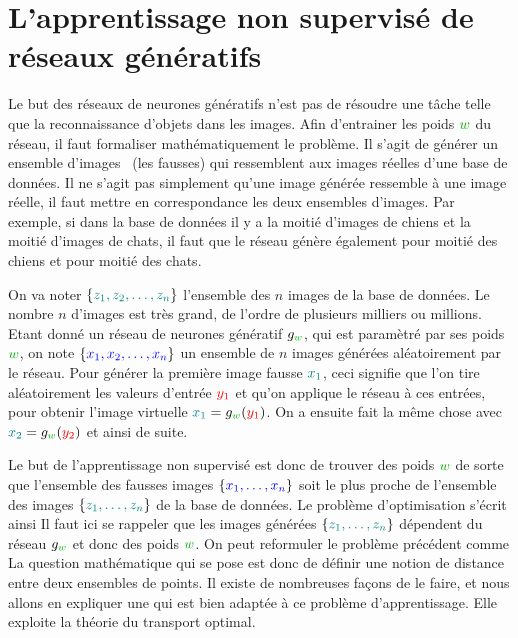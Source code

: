 \section{L'apprentissage non supervisé de réseaux génératifs}
\label{sec-app-gen}

Le but des réseaux de neurones génératifs n'est pas de résoudre une tâche telle que la reconnaissance d'objets dans les images. 
%
Afin d'entrainer les poids $\mygreen{w}$ du réseau, il faut formaliser mathématiquement le problème. Il s'agit de générer un ensemble d'images  (les fausses) qui ressemblent aux images réelles d'une base de données. Il ne s'agit pas simplement qu'une image générée ressemble à une image réelle, il faut mettre en correspondance les deux ensembles d'images. Par exemple, si dans la base de données il y a la moitié d'images de chiens et la moitié d'images de chats, il faut que le réseau génère également pour moitié des chiens et pour moitié des chats. 

On va noter $\{\mylblue{z_1,z_2,\ldots,z_n}\}$ l'ensemble des $n$ images de la base de données. Le nombre $n$ d'images est très grand, de l'ordre de plusieurs milliers ou millions. Etant donné un réseau de neurones génératif $g_{\mygreen{w}}$, qui est paramètré par ses poids $\mygreen{w}$, on note $\{\myblue{x_1,x_2,\ldots,x_n}\}$ un ensemble de $n$ images  générées aléatoirement par le réseau. Pour générer la première image fausse $\mylblue{x_1}$, ceci signifie que l'on tire aléatoirement les valeurs d'entrée ${\color{red}y_1}$ et qu'on applique le réseau à ces entrées, pour obtenir l'image virtuelle $\mylblue{x_1} = g_{\mygreen{w}}({\color{red}y_1})$. On a ensuite fait la même chose avec $\mylblue{x_2} = g_{\mygreen{w}}({\color{red}y_2})$ et ainsi de suite. 

Le but de l'apprentissage non supervisé est donc de trouver des poids $\mygreen{w}$ de sorte que l'ensemble des fausses images $\{\myblue{x_1,\ldots,x_n}\}$ soit le plus proche de l'ensemble des images $\{\mylblue{z_1,\ldots,z_n}\}$  de la base de données. Le problème d'optimisation s'écrit ainsi 
Il faut ici se rappeler que les images générées $\{\mylblue{z_1,\ldots,z_n}\}$ dépendent du réseau $g_{\mygreen{w}}$ et donc des poids $\mygreen{w}$. On peut reformuler le problème précédent comme
%
La question mathématique qui se pose est donc de définir une notion de distance entre deux ensembles de points. Il existe de nombreuses façons de le faire, et nous allons en expliquer une qui est bien adaptée à ce problème d'apprentissage. 
%
Elle exploite la théorie du transport optimal.


